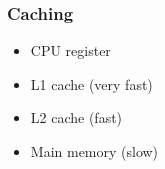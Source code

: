 \documentclass{beamer}
\begin{document}





\begin{frame}
  \frametitle{Caching}
  \begin{itemize}
  \item CPU register
  \item L1 cache (very fast)
  \item L2 cache (fast)
  \item Main memory (slow)
  \end{itemize}
\end{frame}





\end{document}
